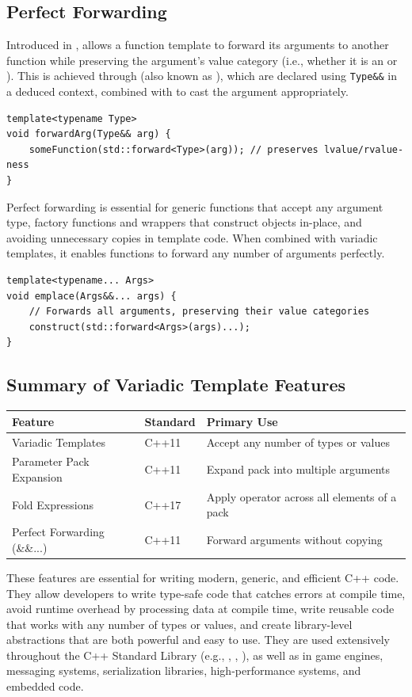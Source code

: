 \subsection{Perfect Forwarding}
Introduced in ,  allows a function template to forward its arguments to another function while preserving the argument's value category (i.e., whether it is an  or ). This is achieved through  (also known as ), which are declared using \texttt{Type\&\&} in a deduced context, combined with  to cast the argument appropriately.
\begin{lstlisting}
template<typename Type>
void forwardArg(Type&& arg) {
    someFunction(std::forward<Type>(arg)); // preserves lvalue/rvalue-ness
}
\end{lstlisting}
Perfect forwarding is essential for generic functions that accept any argument type, factory functions and wrappers that construct objects in-place, and avoiding unnecessary copies in template code. When combined with variadic templates, it enables functions to forward any number of arguments perfectly.
\begin{lstlisting}
template<typename... Args>
void emplace(Args&&... args) {
    // Forwards all arguments, preserving their value categories
    construct(std::forward<Args>(args)...);
}
\end{lstlisting}

\subsection{Summary of Variadic Template Features}
\begin{fancybox}{}
\begin{center}
\begin{tabular}{l|l|l}
Feature & Standard & Primary Use\\
\hline
Variadic Templates & C++11 & Accept any number of types or values \\
Parameter Pack Expansion & C++11 & Expand pack into multiple arguments \\
Fold Expressions & C++17 & Apply operator across all elements of a pack \\
Perfect Forwarding (\&\&...) & C++11 & Forward arguments without copying \\
\end{tabular}
\end{center}
\end{fancybox}
These features are essential for writing modern, generic, and efficient C++ code. They allow developers to write type-safe code that catches errors at compile time, avoid runtime overhead by processing data at compile time, write reusable code that works with any number of types or values, and create library-level abstractions that are both powerful and easy to use. They are used extensively throughout the C++ Standard Library (e.g., , , ), as well as in game engines, messaging systems, serialization libraries, high-performance systems, and embedded code.



